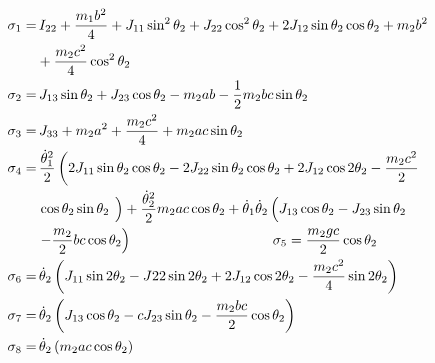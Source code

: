 \documentclass[conference]{IEEEtran}
\begin{document}
\vspace{18px}

\begin{footnotesize}
    \begin{align*}
        \sigma_1 = & \, I_{22}+\frac{m_1 b^2}{4}+J_{11} \sin ^2 \theta_2+J_{22} \cos ^2 \theta_2+2 J_{12} \sin \theta_2 \cos \theta_2 + m_2 b^2                                                                                                                   \\
                   & +\frac{m_2 c^2}{4} \cos ^2 \theta_2                                                                                                                                                                                                          \\
        \sigma_2 = & \, J_{13} \sin \theta_2+J_{23} \cos \theta_2-m_2 a b-\frac{1}{2} m_2 b c \sin \theta_2                                                                                                                                                       \\
        \sigma_3 = & \, J_{33}+m_2 a^2+\frac{m_2 c^2}{4}+m_2 a c \sin \theta_2   \\ %
        \sigma_4 = & \, \frac{\dot{\theta}_1^2}{2}\left(2 J_{11} \sin \theta_2 \cos \theta_2 - 2 J_{22} \sin \theta_2 \cos \theta_2 + 2 J_{12} \cos 2\theta_2 - \frac{m_2 c^2}{2}\right.                                                                          \\
                   & \left. \cos \theta_2 \sin \theta_2 \genfrac{}{}{0pt}{}{\,}{\,}\right) + \frac{\dot{\theta}_2^2}{2}m_2 a c \cos \theta_2 + \dot{\theta}_1\dot{\theta}_2 \left(J_{13} \cos \theta_2 - J_{23} \sin \theta_2 \genfrac{}{}{0pt}{}{\,}{\,} \right. \\
                   & \left. - \frac{m_2}{2}b c \cos \theta_2\right)      \hspace{100px}       \sigma_5=  \frac{m_2 g c}{2} \cos \theta_2                                                                                                                         \\
                   \sigma_6 = & \, \dot{\theta}_2 \left(J_{11} \sin 2\theta_2 - J{22} \sin 2\theta_2 + 2 J_{12} \cos 2\theta_2 - \frac{m_2 c^2}{4} \sin 2\theta_2\right) \\
                   \sigma_7 = & \, \dot{\theta}_2 \left(J_{13} \cos \theta_2 -cJ_{23} \sin \theta_2 - \frac{m_2 b c}{2} \cos \theta_2\right)                             \\
                   \sigma_8 = & \, \dot{\theta}_2 \left(m_2 a c \cos \theta_2\right)
    \end{align*}
\end{footnotesize}
\end{document}
